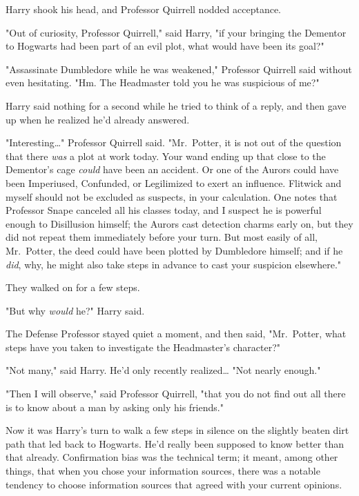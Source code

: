 Harry shook his head, and Professor Quirrell nodded acceptance.

"Out of curiosity, Professor Quirrell," said Harry, "if your bringing the 
Dementor to Hogwarts had been part of an evil plot, what would have been its 
goal?"

"Assassinate Dumbledore while he was weakened," Professor Quirrell said without 
even hesitating. "Hm. The Headmaster told you he was suspicious of me?"

Harry said nothing for a second while he tried to think of a reply, and then 
gave up when he realized he'd already answered.

"Interesting{\ldots}" Professor Quirrell said. "Mr.~Potter, it is not out of 
the question that there \emph{was} a plot at work today. Your wand ending up 
that close to the Dementor's cage \emph{could} have been an accident. Or one of 
the Aurors could have been Imperiused, Confunded, or Legilimized to exert an 
influence. Flitwick and myself should not be excluded as suspects, in your 
calculation. One notes that Professor Snape canceled all his classes today, and 
I suspect he is powerful enough to Disillusion himself; the Aurors cast 
detection charms early on, but they did not repeat them immediately before your 
turn. But most easily of all, Mr.~Potter, the deed could have been plotted by 
Dumbledore himself; and if he \emph{did}, why, he might also take steps in 
advance to cast your suspicion elsewhere."

They walked on for a few steps.

"But why \emph{would} he?" Harry said.

The Defense Professor stayed quiet a moment, and then said, "Mr.~Potter, what 
steps have you taken to investigate the Headmaster's character?"

"Not many," said Harry. He'd only recently realized{\ldots} "Not nearly enough."

"Then I will observe," said Professor Quirrell, "that you do not find out all 
there is to know about a man by asking only his friends."

Now it was Harry's turn to walk a few steps in silence on the slightly beaten 
dirt path that led back to Hogwarts. He'd really been supposed to know better 
than that already. Confirmation bias was the technical term; it meant, among 
other things, that when you chose your information sources, there was a notable 
tendency to choose information sources that agreed with your current opinions.

